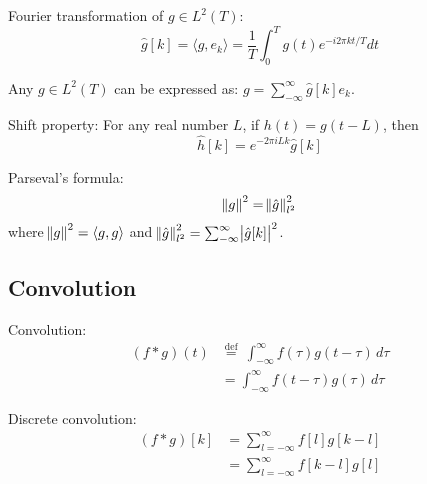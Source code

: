 \documentclass[12pt]{article}
\numberwithin{equation}{section}
\begin{document}
Fourier transformation of $g \in L^2(T)$: 
\begin{equation}\label{eq:fourierL2T}
	\hat{g}[k] = \langle g , e_k \rangle = \frac{1}{T} \int^{T}_{0} g(t)e^{-i 2\pi kt/T} dt
\end{equation} \par

Any $g \in L^2(T)$ can be expressed as: $g=\sum^{\infty}_{-\infty}\hat{g}[k] e_k$. \par
Shift property: For any real number $L$, if $h(t)=g(t-L)$, then
\begin{equation} \label{eq:fouriershift}
	\hat{h}[k]=e^{-2\pi i L k} \hat{g}[k]
\end{equation}

Parseval's formula: 
\begin{equation} \label{eq:parseval}
	\norm{g}^2=\norm{\hat{g}}^2_{l^2}
\end{equation}
where $\norm{g}^2= \langle g , g \rangle$ and $\norm{\hat{g}}^2_{l^2}=\sum^{\infty}_{-\infty}\abs{\hat{g}[k]}^2$. \par

\subsection{Convolution}
Convolution:
\begin{align} \label{eq:conv}
	(f * g )(t) &\stackrel{\mathrm{def}}{=}\ \int_{-\infty}^\infty f(\tau) g(t - \tau) \, d\tau \\
	&= \int_{-\infty}^\infty f(t-\tau) g(\tau)\, d\tau
\end{align} \par

Discrete convolution: 
\begin{align}
	(f * g)[k] &= \sum_{l=-\infty}^\infty f[l] g[k - l] \\
			&= \sum_{l=-\infty}^\infty f[k-l] g[l]
\end{align} \par
\end{document}
